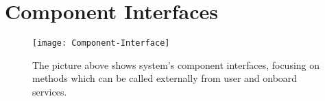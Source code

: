 \section{Component Interfaces}

\begin{figure}[H]
	\centering
	\texttt{[image: Component-Interface]}
	\caption[Component Interfaces Diagram]{The picture above shows system's component interfaces, focusing on methods which can be called externally from user and onboard services.}
	\label{fig:ComponentInterfaceDiagram}
\end{figure}
